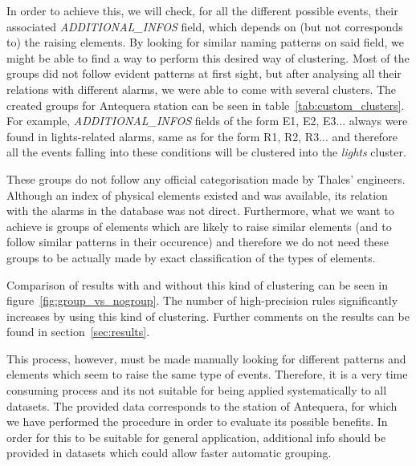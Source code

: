In order to achieve this, we will check, for all the different possible events, their associated \emph{ADDITIONAL\_INFOS} field, which depends on (but not corresponds to) the raising elements. By looking for similar naming patterns on said field, we might be able to find a way to perform this desired way of clustering. Most of the groups did not follow evident patterns at first sight, but after analysing all their relations with different alarms, we were able to come with several clusters. The created groups for Antequera station can be seen in table~\ref{tab:custom_clusters}. For example, \emph{ADDITIONAL\_INFOS} fields of the form E1, E2, E3... always were found in lights-related alarms, same as for the form R1, R2, R3... and therefore all the events falling into these conditions will be clustered into the \emph{lights} cluster.

These groups do not follow any official categorisation made by Thales' engineers. Although an index of physical elements existed and was available, its relation with the alarms in the database was not direct. Furthermore, what we want to achieve is groups of elements which are likely to raise similar elements (and to follow similar patterns in their occurence) and therefore we do not need these groups to be actually made by exact classification of the types of elements.

Comparison of results with and without this kind of clustering can be seen in figure~\ref{fig:group_vs_nogroup}. The number of high-precision rules significantly increases by using this kind of clustering. Further comments on the results can be found in section~\ref{sec:results}.

This process, however, must be made manually looking for different patterns and elements which seem to raise the same type of events. Therefore, it is a very time consuming process and its not suitable for being applied systematically to all datasets. The provided data corresponds to the station of Antequera, for which we have performed the procedure in order to evaluate its possible benefits. In order for this to be suitable for general application, additional info should be provided in datasets which could allow faster automatic grouping.

